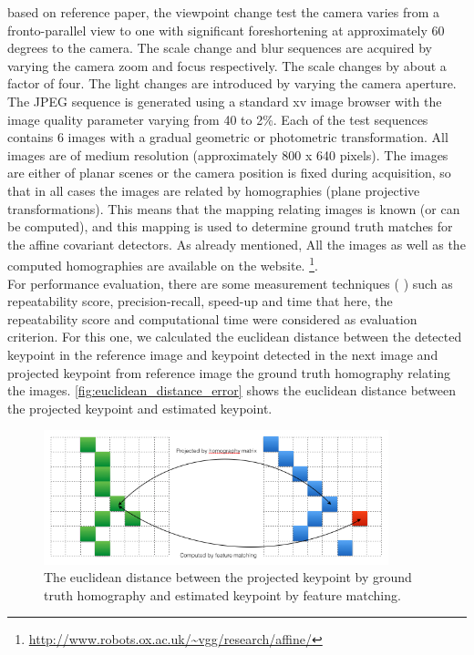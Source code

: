 based on \cite{mikolajczyk2005comparison} reference paper, the viewpoint change test the camera varies from a fronto-parallel view to one with significant foreshortening at approximately 60 degrees to the camera. The scale change and blur sequences are acquired by varying the camera zoom and focus respectively. The scale changes by about a factor of four. The light changes are introduced by varying the camera aperture. The JPEG sequence is generated using a standard xv image browser with the image quality parameter varying from 40 to 2\%. Each of the test sequences contains 6 images with a gradual geometric or photometric transformation. All images are of medium resolution (approximately 800 x 640 pixels). The images are either of planar scenes or the camera position is fixed during acquisition, so that in all cases the images are related by homographies (plane projective transformations). This means that the mapping relating images is known (or can be computed), and this mapping is used to determine ground truth matches for the affine covariant detectors. As already mentioned, All the images as well as the computed homographies are available on the website. \footnote {\url{http://www.robots.ox.ac.uk/~vgg/research/affine/}}.\\
For performance evaluation, there are some measurement techniques (\cite{mikolajczyk2005comparison} \cite{mikolajczyk2005performance}) such as repeatability score, precision-recall, speed-up and time that here, the repeatability score and computational time were considered as evaluation criterion. For this one, we calculated the euclidean distance between the detected keypoint in the reference image and keypoint detected in the next image and projected keypoint from reference image the ground truth homography relating the images. \autoref{fig:euclidean_distance_error} shows the euclidean distance between the projected keypoint and estimated keypoint.
\begin{figure}[H]
  \centering
  \includegraphics[width=100mm]{figures/euclidean_distance}
  \caption{The euclidean distance between the projected keypoint by ground truth homography and estimated keypoint by feature matching. }\label{fig:euclidean_distance_error}
\end{figure}

